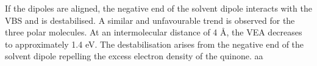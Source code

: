 If the dipoles are aligned, the negative end of the solvent dipole interacts with the VBS and is destabilised. A similar and unfavourable trend is observed for the three polar molecules. At an intermolecular distance of 4 \r{A}, the VEA decreases to approximately 1.4 eV. The destabilisation arises from the negative end of the solvent dipole repelling the excess electron density of the quinone.
aa


\cleardoublepage

